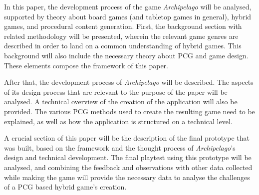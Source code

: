 
In this paper, the development process of the game \textit{Archipelago} will be analysed, supported by theory about board games (and tabletop games in general), hybrid games, and procedural content generation. First, the background section with related methodology will be presented, wherein the relevant game genres are described in order to land on a common understanding of hybrid games. This background will also include the necessary theory about PCG and game design. These elements compose the framework of this paper.

After that, the development process of \textit{Archipelago} will be described. The aspects of its design process that are relevant to the purpose of the paper will be analysed. A technical overview of the creation of the application will also be provided. The various PCG methods used to create the resulting game need to be explained, as well as how the application is structured on a technical level. 

A crucial section of this paper will be the description of the final prototype that was built, based on the framework and the thought process of \textit{Archipelago}'s design and technical development. The final playtest using this prototype will be analysed, and combining the feedback and observations with other data collected while making the game will provide the necessary data to analyse the challenges of a PCG based hybrid game's creation.

